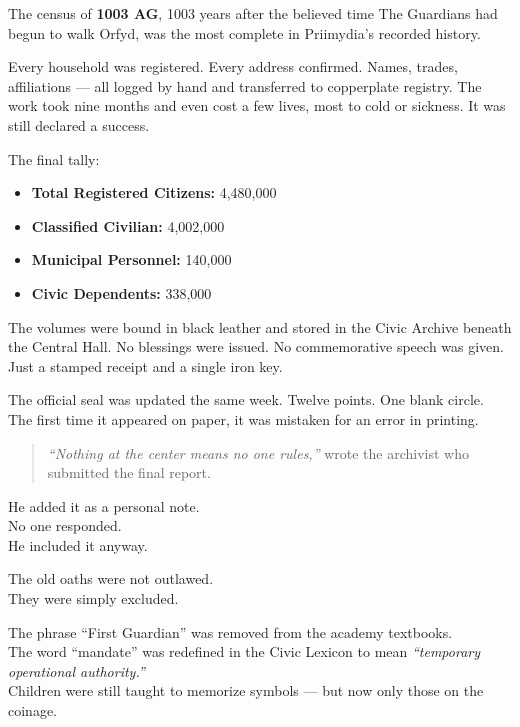 \documentclass[9pt]{article}
\begin{document}
The census of \textbf{1003 AG}, 1003 years after the believed time The Guardians had begun to walk Orfyd, was the most complete in Priimydia’s recorded history.

Every household was registered. Every address confirmed. Names, trades, affiliations --- all logged by hand and transferred to copperplate registry. The work took nine months and even cost a few lives, most to cold or sickness. It was still declared a success.

The final tally:
\begin{itemize}
    \item \textbf{Total Registered Citizens:} 4,480,000
    \item \textbf{Classified Civilian:} 4,002,000
    \item \textbf{Municipal Personnel:} 140,000
    \item \textbf{Civic Dependents:} 338,000
\end{itemize}

The volumes were bound in black leather and stored in the Civic Archive beneath the Central Hall. No blessings were issued. No commemorative speech was given. Just a stamped receipt and a single iron key.

\vspace{1em}

The official seal was updated the same week. Twelve points. One blank circle. The first time it appeared on paper, it was mistaken for an error in printing.

\begin{quote}
\textit{“Nothing at the center means no one rules,”} wrote the archivist who submitted the final report.
\end{quote}

He added it as a personal note.\\
No one responded.\\
He included it anyway.

\vspace{1em}

The old oaths were not outlawed.\\
They were simply excluded.

The phrase ``First Guardian'' was removed from the academy textbooks.\\
The word ``mandate'' was redefined in the Civic Lexicon to mean \textit{“temporary operational authority.”}\\
Children were still taught to memorize symbols --- but now only those on the coinage.
\end{document}
